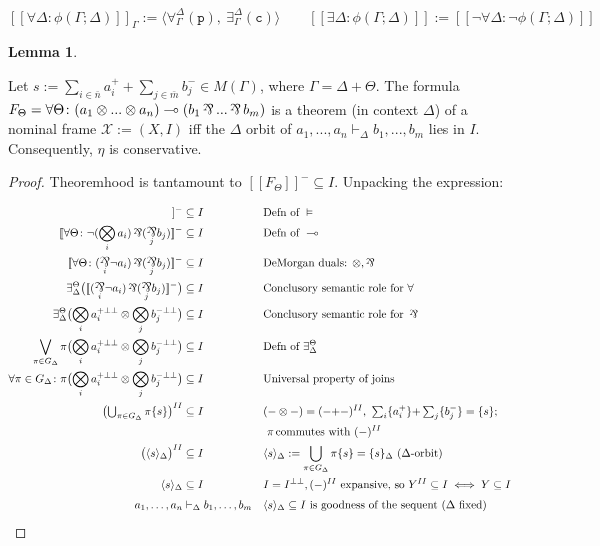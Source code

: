 \documentclass{article}
\makeatletter
\newcommand{\allproofs}{} %
\newif\ifproofsinappendix
\newcommand{\lemmawithproof}[3]{%
  \begin{lemma}\label{#1}
    #2  
    \ifproofsinappendix \hyperref[xxx#1]{(Proof)} \fi
  \end{lemma}
    \ifproofsinappendix
  \g@addto@macro\allproofs{%
    \par\medskip
    \noindent
    \subsection*{\cref{#1}}\par
    #2\par
    \begin{proof}\label{xxx#1}
      #3
    \end{proof}%
  }
      \else

    \begin{proof}
      #3
    \end{proof}
    \fi 
}
\theoremstyle{definition}
\newtheorem{lemma}{Lemma}[section]
\DeclareMathOperator{\parr}{\rotatebox[origin=c]{180}{\&}}
\newcommand{\cX}{\mathcal{X}}
\newcommand{\bbrack}[1]{[\![ #1 ]\!]}
\makeatother
\begin{document}
$$\bbrack{\forall \Delta\colon \phi(\Gamma;\Delta)}_{\Gamma}:=\langle \forall^\Delta_\Gamma(\texttt{p}),\ \exists^\Delta_\Gamma(\texttt{c}) \rangle \qquad \bbrack{\exists \Delta\colon \phi(\Gamma;\Delta)} := \bbrack{\neg \forall \Delta\colon \neg \phi(\Gamma;\Delta)}$$


\lemmawithproof{prop:conservativity}{
    Let $s:=\sum_{i \in \bar n} a^+_i + \sum_{j \in \bar m} b^-_j \in M(\Gamma)$, where $\Gamma=\Delta+\Theta$. The formula $F_\Theta = \forall \Theta\colon (a_1 \otimes ... \otimes a_n)\multimap (b_1 \parr ... \parr b_m)$ is a theorem (in context $\Delta$) of a nominal frame $\cX := (X, I)$ iff the $\Delta$ orbit of $a_1,...,a_n\vdash_\Delta b_1,...,b_m$ lies in $I$.
    Consequently, $\eta$ is conservative.
}{

   Theoremhood is tantamount to $\bbrack{F_\Theta}^-\subseteq I$. Unpacking the expression:

   \begin{align*}
    \bbrack{F_\Theta}^- &\subseteq I&& \text{Defn of }\vDash\\ 
    \bbrack{\forall \Theta\colon \neg(\bigotimes_i a_i)\parr ({\large{\underset{j}{\parr}}} b_j)}^- &\subseteq I&& \text{Defn of }\multimap\\ 
    \bbrack{\forall \Theta\colon ({\large{\underset{i}{\parr}}} \neg a_i)\parr ({\large{\underset{j}{\parr}}} b_j)}^- &\subseteq I&& \text{DeMorgan duals: }\otimes,\parr \\ 
    \exists^\Theta_\Delta\bigl(\bbrack{({\large{\underset{i}{\parr}}} \neg a_i)\parr ({\large{\underset{j}{\parr}}} b_j)}^-\bigr) &\subseteq I&& \text{Conclusory semantic role for }\forall\\ 
    \exists^\Theta_\Delta\bigl(\bigotimes_i a^{+\bot\bot}_i \otimes \bigotimes_j b^{-\bot\bot}_j\bigr) &\subseteq I&& \text{Conclusory semantic role for }\parr\\ 
    \bigvee_{\pi \in G_\Delta} \pi\bigl(\bigotimes_i a^{+\bot\bot}_i \otimes \bigotimes_j b^{-\bot\bot}_j\bigr) &\subseteq I&& \text{Defn of }\exists^\Theta_\Delta\\ 
    \forall \pi \in G_\Delta\colon \pi\bigl(\bigotimes_i a^{+\bot\bot}_i \otimes \bigotimes_j b^{-\bot\bot}_j\bigr) &\subseteq I&& \text{Universal property of joins}\\
   \bigl(\textstyle\bigcup_{\pi\in G_\Delta}\pi\{s\}\bigr)^{II} &\subseteq I
     && (-\otimes-)=(-{+}-)^{II},\ \textstyle\sum_i\{a_i^+\}{+}\sum_j\{b_j^-\}=\{s\};\\ &&&\ \pi\,\text{commutes with }(-)^{II}\\
  \bigl(\langle s\rangle_\Delta\bigr)^{II} &\subseteq I
     && \langle s\rangle_\Delta:=\bigcup_{\pi\in G_\Delta}\pi\{s\}=\{s\}_\Delta\ (\Delta\text{-orbit})\\
   \langle s\rangle_\Delta &\subseteq I
     && I=I^{\bot\bot}, (-)^{II}\text{ expansive, so }Y^{II}\subseteq I\iff Y\subseteq I\\
   a_1,\dots,a_n &\vdash_\Delta b_1,\dots,b_m
     && \langle s\rangle_\Delta\subseteq I\ \text{is goodness of the sequent }(\Delta\text{ fixed})   
    \end{align*}
    
}
\end{document}

